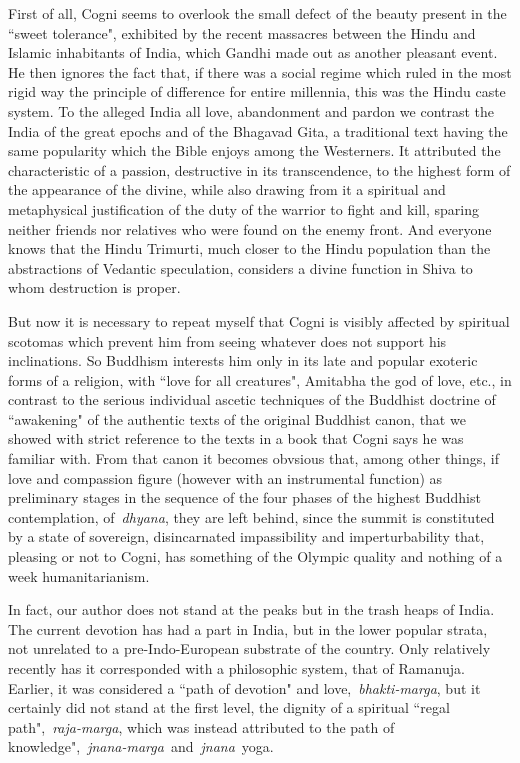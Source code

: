 First of all, Cogni seems to overlook the small defect of the beauty present in the ``sweet tolerance", exhibited by the
recent massacres between the Hindu and Islamic inhabitants of India, which Gandhi made out as another pleasant event.
He then ignores the fact that, if there was a social regime which ruled in the most rigid way the principle of
difference for entire millennia, this was the Hindu caste system. To the alleged India all love, abandonment and pardon
we contrast the India of the great epochs and of the Bhagavad Gita, a traditional text having the same popularity which
the Bible enjoys among the Westerners. It attributed the characteristic of a passion, destructive in its transcendence,
to the highest form of the appearance of the divine, while also drawing from it a spiritual and metaphysical
justification of the duty of the warrior to fight and kill, sparing neither friends nor relatives who were found on the
enemy front. And everyone knows that the Hindu Trimurti, much closer to the Hindu population than the abstractions of
Vedantic speculation, considers a divine function in Shiva to whom destruction is proper.

But now it is necessary to repeat myself that Cogni is visibly affected by spiritual scotomas which prevent him from
seeing whatever does not support his inclinations. So Buddhism interests him only in its late and popular exoteric
forms of a religion, with ``love for all creatures", Amitabha the god of love, etc., in contrast to the serious
individual ascetic techniques of the Buddhist doctrine of ``awakening" of the authentic texts of the original Buddhist
canon, that we showed with strict reference to the texts in a book that Cogni says he was familiar with. From that
canon it becomes obvsious that, among other things, if love and compassion figure (however with an instrumental
function) as preliminary stages in the sequence of the four phases of the highest Buddhist contemplation,
of \emph{dhyana}, they are left behind, since the summit is constituted by a state of sovereign, disincarnated
impassibility and imperturbability that, pleasing or not to Cogni, has something of the Olympic quality and nothing of
a week humanitarianism.

In fact, our author does not stand at the peaks but in the trash heaps of India. The current devotion has had a part in
India, but in the lower popular strata, not unrelated to a pre-Indo-European substrate of the country. Only relatively
recently has it corresponded with a philosophic system, that of Ramanuja. Earlier, it was considered a ``path of
devotion" and love, \emph{bhakti-marga}, but it certainly did not stand at the first level, the dignity of a spiritual
``regal path", \emph{raja-marga}, which was instead attributed to the path of
knowledge", \emph{jnana-marga} and \emph{jnana} yoga.

